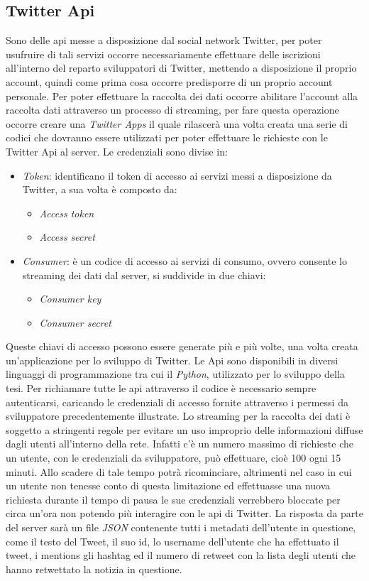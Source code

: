 \subsection{Twitter Api}
Sono delle api messe a disposizione dal social network Twitter, per poter usufruire di tali servizi occorre necessariamente effettuare delle iscrizioni all'interno del reparto sviluppatori di Twitter, mettendo a disposizione il proprio account, quindi come prima cosa occorre predisporre di un proprio account personale. Per poter effettuare la raccolta dei dati occorre abilitare l'account alla raccolta dati attraverso un processo di streaming, per fare questa operazione occorre creare una \textit{Twitter Apps} il quale rilascerà una volta creata una serie di codici che dovranno essere utilizzati per poter effettuare le richieste con le Twitter Api al server.
Le credenziali sono divise in:
\begin{itemize}
\item \textit{Token}: identificano il token di accesso ai servizi messi a disposizione da Twitter, a sua volta è composto da:
\begin{itemize}
\item \textit{Access token}
\item \textit{Access secret}
\end{itemize}
\item \textit{Consumer}: è un codice di accesso ai servizi di consumo, ovvero consente lo streaming dei dati dal server, si suddivide in due chiavi:
\begin{itemize}
\item \textit{Consumer key}
\item \textit{Consumer secret}
\end{itemize}
\end{itemize}
Queste chiavi di accesso possono essere generate più e più volte, una volta creata un'applicazione per lo sviluppo di Twitter.
Le Api sono disponibili in diversi linguaggi di programmazione tra cui il \textit{Python}, utilizzato per lo sviluppo della tesi.
Per richiamare tutte le api attraverso il codice è necessario sempre autenticarsi, caricando le credenziali di accesso  fornite attraverso i permessi da sviluppatore precedentemente illustrate.
Lo streaming per la raccolta dei dati è soggetto a stringenti regole per evitare un uso improprio delle informazioni diffuse dagli utenti all'interno della rete. Infatti c'è un numero massimo di richieste che un utente, con le credenziali da sviluppatore, può effettuare, cioè 100 ogni 15 minuti. Allo scadere di tale tempo potrà ricominciare, altrimenti nel caso in cui un utente non tenesse conto di questa limitazione ed effettuasse una nuova richiesta durante il tempo di pausa le sue credenziali verrebbero bloccate per circa un'ora non potendo più interagire con le api di Twitter.
La risposta da parte del server sarà un file \textit{JSON} contenente tutti i metadati dell'utente in questione, come il testo del Tweet, il suo id, lo username dell'utente che ha effettuato il tweet, i mentions gli hashtag ed il numero di retweet con la lista degli utenti che hanno retwettato la notizia in questione.

